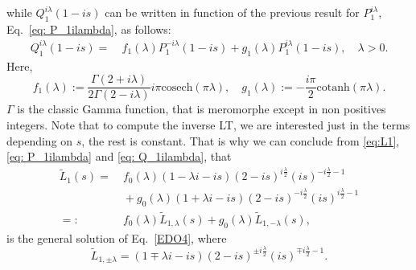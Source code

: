 \documentclass[%
 aip,
 jmp,%
 amsmath,amssymb,
 reprint,%
]{revtex4-2}
\begin{document}
while $Q_1^{i\lambda}(1-is)$ can be written in function of the previous result for $P_1^{i\lambda}$, Eq.~\eqref{eq: P_1ilambda}, as follows:
\begin{equation} \label{eq: Q_1ilambda}
    \begin{aligned}
    Q_1^{i\lambda}(1-is)= &~{} f_1(\lambda)P_1^{-i \lambda }(1-i s) + g_1(\lambda) P_1^{i \lambda }(1-i s), \quad \lambda>0. %
    \end{aligned}
\end{equation}
Here,
\begin{equation}\label{eq:f_1 and g_1}
    f_1(\lambda):= \frac{ \Gamma (2+i \lambda)}{2 \Gamma (2-i \lambda )}i \pi  \text{cosech}(\pi  \lambda ), \quad g_1(\lambda) := -\frac{i \pi}{2}   \text{cotanh} (\pi  \lambda ).
\end{equation}
$\Gamma$ is the classic Gamma function, that is meromorphe except in non positives integers. Note that to compute the inverse LT, we are interested just in the terms depending on $s$, the rest is constant. That is why we can conclude from \eqref{eq:L1}, \eqref{eq: P_1ilambda} and \eqref{eq: Q_1ilambda}, that
\begin{equation}\label{L1_final}
\begin{aligned}
\widetilde L_1(s)= &~{} f_0(\lambda) (1-\lambda i-i s) (2-i s)^{i\frac{\lambda}{2} } (i s)^{-i\frac{\lambda}{2}-1} \\
&~{} + g_0(\lambda) (1+ \lambda i-i s) (2-i s)^{-i\frac{\lambda}{2} } (i s)^{i\frac{\lambda}{2}-1} \\
= : &~{} f_0(\lambda) \widetilde L_{1,\lambda}(s) +  g_0(\lambda) \widetilde L_{1,-\lambda}(s),
\end{aligned}
\end{equation}
is the general solution of Eq.~\eqref{EDO4}, where
\begin{equation*}
    \widetilde{L}_{1,\pm\lambda} = (1 \mp \lambda i-i s) (2-i s)^{\pm i\frac{\lambda}{2} } (i s)^{\mp i\frac{\lambda}{2}-1}.
\end{equation*}
\end{document}
